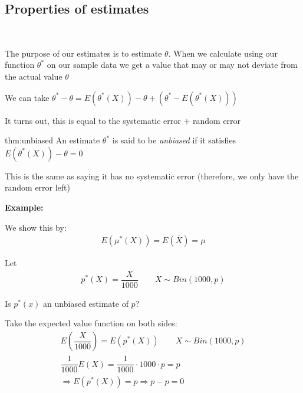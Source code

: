 \subsection{Properties of estimates}\hfill\\\par
\noindent The purpose of our estimates is to estimate $\theta$. When we calculate using our function $\theta^*$ on our sample data we get a value that may or may not deviate from the actual value $\theta$ 
\par\bigskip
\noindent We can take $\theta^*-\theta = E(\theta^*(X))-\theta+(\theta^*-E(\theta^*(X)))$\par
\noindent It turns out, this is equal to the systematic error + random error
\par\bigskip
\begin{theo}{thm:unbiased}
  An estimate $\theta^*$ is said to be \textit{unbiased} if it satisfies $E(\theta^*(X)) - \theta=0$ 
  \par\bigskip
  \noindent This is the same as saying it has no systematic error (therefore, we only have the random error left)
\end{theo}
\par\bigskip
\noindent\textbf{Example:}\par
\noindent We show this by:
\begin{equation*}
  \begin{gathered}
    E(\mu^*(X)) = E(\overline{X}) = \mu
  \end{gathered}
\end{equation*}
\par\bigskip
\noindent Let
\begin{equation*}
  \begin{gathered}
    p^*(X) = \dfrac{X}{1000}\qquad X\sim Bin(1000,p)
  \end{gathered}
\end{equation*}\par
\noindent Is $p^*(x)$ an unbiased estimate of $p$?\par
\noindent Take the expected value function on both sides:
\begin{equation*}
  \begin{gathered}
    E\left(\dfrac{X}{1000}\right) = E(p^*(X))\qquad X \sim Bin(1000,p)\\
    \dfrac{1}{1000}E(X) = \dfrac{1}{1000}\cdot1000\cdot p = p\\
    \Rightarrow E(p^*(X)) = p\Rightarrow p-p=0
  \end{gathered}
\end{equation*}

